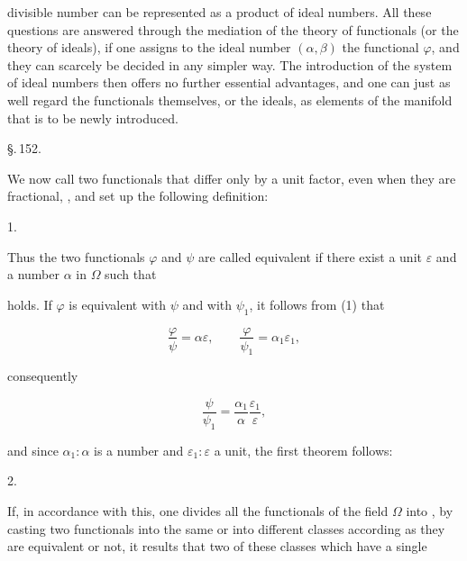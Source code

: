 divisible number can be represented as a product of ideal
numbers. All these questions are answered through the mediation
of the theory of functionals (or the theory of ideals), if one
assigns to the ideal number $(\alpha, \beta)$ the functional $\varphi$, and they can
scarcely be decided in any simpler way. The introduction
of the system of ideal numbers then offers no further
essential advantages, and one can just as well regard the
functionals themselves, or the ideals, as elements of the
manifold that is to be newly introduced.

\begin{center}
\S.\,152.

\end{center}

We now call two functionals that differ only by a
unit factor, even when they are fractional,
, and set up the following definition:

1. 

Thus the two functionals $\varphi$ and $\psi$ are called equivalent
if there exist a unit $\varepsilon$ and a number $\alpha$ in $\Omega$ such that


holds. If $\varphi$ is equivalent with $\psi$ and with $\psi_1$, it follows from (1) that

\[
\frac{\varphi}{\psi} = \alpha\varepsilon, \qquad \frac{\varphi}{\psi_1} = \alpha_1\varepsilon_1,
\]

consequently

\[
\frac{\psi}{\psi_1} = \frac{\alpha_1}{\alpha} \frac{\varepsilon_1}{\varepsilon},
\]

and since $\alpha_1 : \alpha$ is a number and $\varepsilon_1 : \varepsilon$ a unit, the
first theorem follows:

2. 

If, in accordance with this, one divides all the functionals of
the field $\Omega$ into , by casting two functionals into the
same or into different classes according as they are equivalent
or not, it results that two of these classes which have a single
